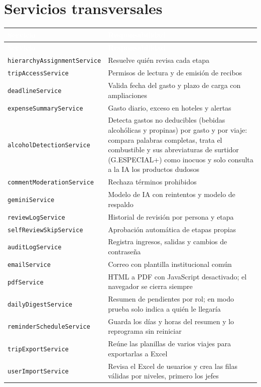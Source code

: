 \documentclass[11pt,letterpaper]{article}
\newcommand{\cabecera}{\rowcolor{maxamPrimario}}
\newcommand{\tth}[1]{\textcolor{white}{\textbf{#1}}}
\newcommand{\code}[1]{\nolinkurl{#1}}
\begin{document}
\section{Servicios transversales}
\begin{xltabular}{\textwidth}{L{5cm} Y}
\cabecera \tth{Servicio} & \tth{Responsabilidad} \\
\endfirsthead
\cabecera \tth{Servicio} & \tth{Responsabilidad} \\
\endhead
{} \code{hierarchyAssignmentService} & Resuelve quién revisa cada etapa \\
\code{tripAccessService} & Permisos de lectura y de emisión de recibos \\
 \code{deadlineService} & Valida fecha del gasto y plazo de carga con ampliaciones \\
\code{expenseSummaryService} & Gasto diario, exceso en hoteles y alertas \\
 \code{alcoholDetectionService} & Detecta gastos no deducibles (bebidas alcohólicas y propinas) por gasto y por viaje: compara palabras completas, trata el combustible y sus abreviaturas de surtidor (G.ESPECIAL+) como inocuos y solo consulta a la IA los productos dudosos \\
\code{commentModerationService} & Rechaza términos prohibidos \\
 \code{geminiService} & Modelo de IA con reintentos y modelo de respaldo \\
\code{reviewLogService} & Historial de revisión por persona y etapa \\
 \code{selfReviewSkipService} & Aprobación automática de etapas propias \\
\code{auditLogService} & Registra ingresos, salidas y cambios de contraseña \\
 \code{emailService} & Correo con plantilla institucional común \\
\code{pdfService} & HTML a PDF con JavaScript desactivado; el navegador se cierra siempre \\
 \code{dailyDigestService} & Resumen de pendientes por rol; en modo prueba solo indica a quién le llegaría \\
\code{reminderScheduleService} & Guarda los días y horas del resumen y lo reprograma sin reiniciar \\
 \code{tripExportService} & Reúne las planillas de varios viajes para exportarlas a Excel \\
\code{userImportService} & Revisa el Excel de usuarios y crea las filas válidas por niveles, primero los jefes \\
\end{xltabular}
\end{document}
